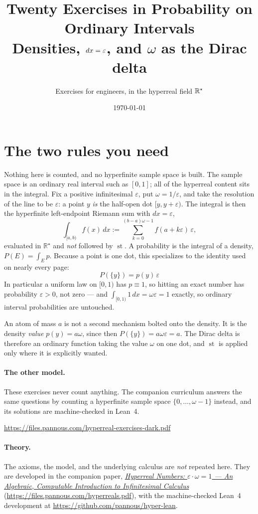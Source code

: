 \documentclass[11pt]{article}
\title{Twenty Exercises in Probability on Ordinary Intervals\\
\large Densities, $dx=\eps$, and $\omega$ as the Dirac delta}
\author{Exercises for engineers, in the hyperreal field $\Rstar$}
\date{\today}
\newcommand{\Rstar}{\mathbb{R}^{\star}}
\newcommand{\eps}{\varepsilon}
\newcommand{\st}{\operatorname{st}}
\begin{document}
\maketitle


\section*{The two rules you need}

Nothing here is counted, and no hyperfinite sample space is built. The sample
space is an ordinary real interval such as $[0,1]$; all of the hyperreal
content sits in the integral. Fix a positive infinitesimal $\eps$, put
$\omega = 1/\eps$, and take the resolution of the line to be $\eps$: a point
$y$ \emph{is} the half-open dot $[y, y+\eps)$. The integral is then the
hyperfinite left-endpoint Riemann sum with $dx = \eps$,
\[
  \int_{[a,b)} f(x)\,dx
  := \sum_{k=0}^{(b-a)\omega-1} f(a+k\eps)\,\eps ,
\]
evaluated in $\Rstar$ and \emph{not} followed by $\st$. A probability is the
integral of a density, $P(E)=\int_E p$. Because a point is one dot, this
specializes to the identity used on nearly every page:
\[
  \boxed{\;P(\{y\}) = p(y)\,\eps\;}
\]
In particular a uniform law on $[0,1)$ has $p \equiv 1$, so hitting an exact
number has probability $\eps > 0$, not zero --- and $\int_{[0,1)} 1\,dx
= \omega\eps = 1$ exactly, so ordinary interval probabilities are untouched.

An atom of mass $a$ is not a second mechanism bolted onto the density. It is
the density \emph{value} $p(y)=a\omega$, since then $P(\{y\})=a\omega\eps=a$.
The Dirac delta is therefore an ordinary function taking the value $\omega$ on
one dot, and $\st$ is applied only where it is explicitly wanted.

\paragraph{The other model.} These exercises never count anything. The
companion curriculum answers the same questions by counting a hyperfinite
sample space $\{0,\dots,\omega-1\}$ instead, and its solutions are
machine-checked in Lean~4.
\begin{center}\small\url{https://files.pannous.com/hyperreal-exercises-dark.pdf}\end{center}

\paragraph{Theory.} The axioms, the model, and the underlying calculus are
\emph{not} repeated here. They are developed in the companion paper,
\href{https://files.pannous.com/hyperreals.pdf}{\emph{Hyperreal Numbers: $\eps\cdot\omega=1$ --- An
Algebraic, Computable Introduction to Infinitesimal Calculus}}
(\url{https://files.pannous.com/hyperreals.pdf}), with the machine-checked Lean~4 development at
\url{https://github.com/pannous/hyper-lean}.
\end{document}
